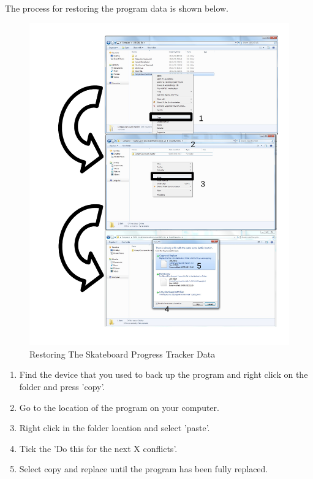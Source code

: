 The process for restoring the program data is shown below.

\begin{figure}[H]
    \includegraphics[width=\textwidth]{./Manual/Images/RestoringData.pdf}
    \caption{Restoring The Skateboard Progress Tracker Data} \label{fig:Restoring Data}
\end{figure}

\begin{enumerate}
\item Find the device that you used to back up the program and right click on the folder and press 'copy'.
\item Go to the location of the program on your computer.
\item Right click in the folder location and select 'paste'.
\item Tick the 'Do this for the next X conflicts'.
\item Select copy and replace until the program has been fully replaced.
\end{enumerate}

